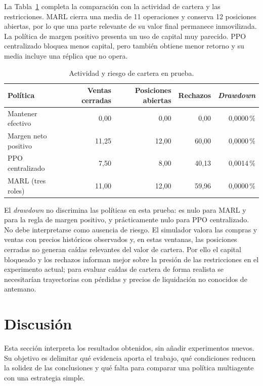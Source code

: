 La Tabla~\ref{tab:riesgo-prueba-final} completa la comparación con la actividad de cartera y las restricciones. MARL cierra una media de 11 operaciones y conserva 12 posiciones abiertas, por lo que una parte relevante de su valor final permanece inmovilizada. La política de margen positivo presenta un uso de capital muy parecido. PPO centralizado bloquea menos capital, pero también obtiene menor retorno y su media incluye una réplica que no opera.

\begin{table}[htbp]
\centering
\begin{tabularx}{\textwidth}{>{\raggedright\arraybackslash}X r r r r}
\toprule
Política & Ventas cerradas & Posiciones abiertas & Rechazos & \emph{Drawdown} \\
\midrule
Mantener efectivo & 0,00 & 0,00 & 0,00 & 0,0000\,\% \\
Margen neto positivo & 11,25 & 12,00 & 60,00 & 0,0000\,\% \\
PPO centralizado & 7,50 & 8,00 & 40,13 & 0,0014\,\% \\
MARL (tres roles) & 11,00 & 12,00 & 59,96 & 0,0000\,\% \\
\bottomrule
\end{tabularx}
\caption{Actividad y riesgo de cartera en prueba.}
\label{tab:riesgo-prueba-final}
\end{table}

El \emph{drawdown} no discrimina las políticas en esta prueba: es nulo para MARL y para la regla de margen positivo, y prácticamente nulo para PPO centralizado. No debe interpretarse como ausencia de riesgo. El simulador valora las compras y ventas con precios históricos observados y, en estas ventanas, las posiciones cerradas no generan caídas relevantes del valor de cartera. Por ello el capital bloqueado y los rechazos informan mejor sobre la presión de las restricciones en el experimento actual; para evaluar caídas de cartera de forma realista se necesitarían trayectorias con pérdidas y precios de liquidación no conocidos de antemano.

\section{Discusión}

Esta sección interpreta los resultados obtenidos, sin añadir experimentos nuevos. Su objetivo es delimitar qué evidencia aporta el trabajo, qué condiciones reducen la solidez de las conclusiones y qué falta para comparar una política multiagente con una estrategia simple.

